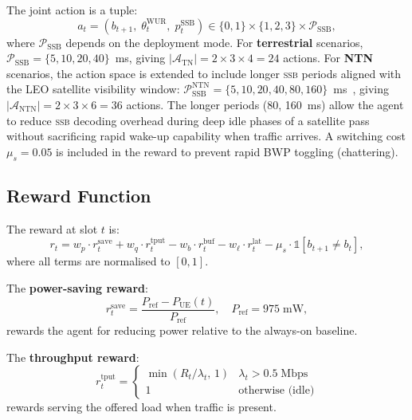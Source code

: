 \documentclass[conference]{IEEEtran}
\newcommand{\ssb}{\textsc{ssb}}
\begin{document}
The joint action is a tuple:
\begin{equation}
  a_t = \left(b_{t+1},\; \theta_t^{\mathrm{WUR}},\; p_t^{\mathrm{SSB}}\right)
        \in \{0,1\} \times \{1,2,3\} \times \mathcal{P}_{\mathrm{SSB}},
  \label{eq:action}
\end{equation}
where $\mathcal{P}_{\mathrm{SSB}}$ depends on the deployment mode.
For \textbf{terrestrial} scenarios, $\mathcal{P}_{\mathrm{SSB}} = \{5, 10, 20, 40\}$~ms,
giving $|\mathcal{A}_{\mathrm{TN}}| = 2 \times 3 \times 4 = 24$ actions.
For \textbf{NTN} scenarios, the action space is extended to include longer
\ssb{} periods aligned with the LEO satellite visibility window:
$\mathcal{P}_{\mathrm{SSB}}^{\mathrm{NTN}} = \{5, 10, 20, 40, 80, 160\}$~ms~\cite{3gpp_tr38821},
giving $|\mathcal{A}_{\mathrm{NTN}}| = 2 \times 3 \times 6 = 36$ actions.
The longer periods (80, 160~ms) allow the agent to reduce \ssb{} decoding
overhead during deep idle phases of a satellite pass without sacrificing
rapid wake-up capability when traffic arrives.
A switching cost $\mu_s = 0.05$ is included in the reward to prevent
rapid BWP toggling (chattering).

\subsection{Reward Function}

The reward at slot $t$ is:
\begin{equation}
  r_t = w_p \cdot r_t^{\mathrm{save}}
      + w_q \cdot r_t^{\mathrm{tput}}
      - w_b \cdot r_t^{\mathrm{buf}}
      - w_\ell \cdot r_t^{\mathrm{lat}}
      - \mu_s \cdot \mathbb{1}[b_{t+1} \neq b_t],
  \label{eq:reward}
\end{equation}
where all terms are normalised to $[0,1]$.

The \textbf{power-saving reward}:
\begin{equation}
  r_t^{\mathrm{save}} = \frac{P_{\mathrm{ref}} - P_{\mathrm{UE}}(t)}{P_{\mathrm{ref}}},
  \quad P_{\mathrm{ref}} = 975\;\mathrm{mW},
  \label{eq:r_save}
\end{equation}
rewards the agent for reducing power relative to the always-on baseline.

The \textbf{throughput reward}:
\begin{equation}
  r_t^{\mathrm{tput}} =
  \begin{cases}
    \min\!\left(R_t / \lambda_t,\, 1\right) & \lambda_t > 0.5\;\mathrm{Mbps} \\
    1 & \text{otherwise (idle)}
  \end{cases}
  \label{eq:r_tput}
\end{equation}
rewards serving the offered load when traffic is present.
\end{document}
